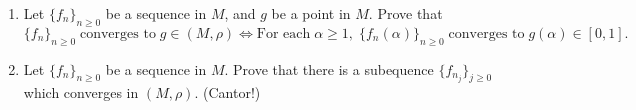 \documentclass[11pt]{article}
\begin{document}
\begin{enumerate}
\begin{enumerate}[label=(\roman*)]
      \item Let \(\{f_n\}_{n \geq 0}\) be a sequence in \(M\), and \(g\) be a point in \(M\).  Prove that 
        \[\{f_n\}_{n \geq 0} \; \text{converges to} \; g \in (M,\rho) \iff
        \text{For each}\; \alpha \geq 1, \; \{f_n(\alpha)\}_{n \geq 0} \;\text{converges to}\; g(\alpha) \in [0,1].
        \]
        
      \item Let \(\{f_n\}_{n \geq 0}\) be a sequence in \(M\).  Prove that there is a subequence 
        \(\{f_{n_j}\}_{j \geq 0}\) which converges in \((M, \rho)\). (Cantor!)
    \end{enumerate}

\end{enumerate}
\end{document}
